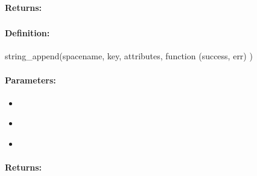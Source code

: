\paragraph{Returns:}


\pagebreak
\subsubsection{}
\label{api:nodejs:string_append}


\paragraph{Definition:}
\begin{javascriptcode}
string_append(spacename, key, attributes, function (success, err) {})
\end{javascriptcode}
\paragraph{Parameters:}
\begin{itemize}[noitemsep]
\item {}\\

\item {}\\

\item {}\\

\end{itemize}

\paragraph{Returns:}


\pagebreak
\subsubsection{}
\label{api:nodejs:cond_string_append}


